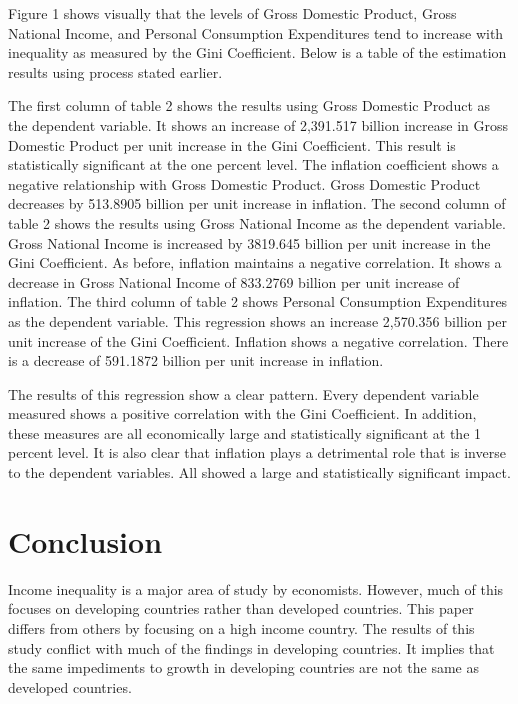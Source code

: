 \documentclass{article}
\begin{document}
\vspace{2mm}



Figure 1 shows visually that the levels of Gross Domestic Product, Gross National Income, and Personal Consumption Expenditures tend to increase with inequality as measured by the Gini Coefficient. Below is a table of the estimation results using process stated earlier.


\vspace{2mm}

\quad The first column of table 2 shows the results using Gross Domestic Product as the dependent variable.  It shows an increase of 2,391.517 billion increase in Gross Domestic Product per unit increase in the Gini Coefficient.  This result is statistically significant at the one percent level.  The inflation coefficient shows a negative relationship with Gross Domestic Product.  Gross Domestic Product decreases by 513.8905 billion per unit increase in inflation.  The second column of table 2 shows the results using Gross National Income as the dependent variable.  Gross National Income is increased by 3819.645 billion per unit increase in the Gini Coefficient.  As before, inflation maintains a negative correlation.  It shows a decrease in Gross National Income of 833.2769 billion per unit increase of inflation. The third column of table 2 shows Personal Consumption Expenditures as the dependent variable.  This regression shows an increase 2,570.356 billion per unit increase of the Gini Coefficient.  Inflation shows a negative correlation.  There is a decrease of 591.1872 billion per unit increase in inflation.  
\vspace{2mm}

\quad The results of this regression show a clear pattern.  Every dependent variable measured shows a positive correlation with the Gini Coefficient.  In addition, these measures are all economically large and  statistically significant at the 1 percent level. It is also clear that inflation plays a detrimental role that is inverse to the dependent variables.  All showed a large and statistically significant impact.

\vspace{2mm}

\section{Conclusion}

\quad Income inequality is a major area of study by economists.  However, much of this focuses on developing countries rather than developed countries. This paper differs from others by focusing on a high income country.  The results of this study conflict with much of the findings in developing countries.  It implies that the same impediments to growth in developing countries are not the same as developed countries.   
\vspace{2mm}
\end{document}
